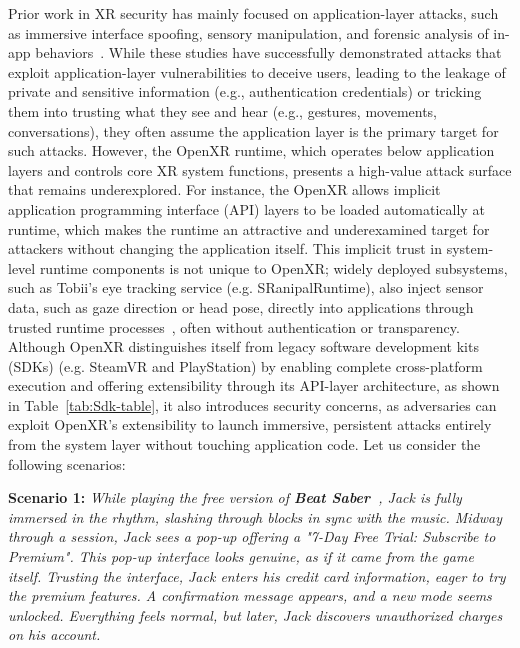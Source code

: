 \documentclass[letterpaper,twocolumn,10pt]{article}
\begin{document}
Prior work in XR security has mainly focused on application-layer attacks, such as immersive interface spoofing, sensory manipulation, and forensic analysis of in-app behaviors~\cite{yang2024inception,ReversingtheVirtualMaze,casey2019inception,kundu2025securing}. While these studies have successfully demonstrated attacks that exploit application-layer vulnerabilities to deceive users, leading to the leakage of private and sensitive information (e.g., authentication credentials) or tricking them into trusting what they see and hear (e.g., gestures, movements, conversations), they often assume the application layer is the primary target for such attacks. However, the OpenXR runtime, which operates below application layers and controls core XR system functions, presents a high-value attack surface that remains underexplored. For instance, the OpenXR allows implicit application programming interface (API) layers to be loaded automatically at runtime, which makes the runtime an attractive and underexamined target for attackers without changing the application itself. This implicit trust in system-level runtime components is not unique to OpenXR; widely deployed subsystems, such as Tobii's eye tracking service (e.g. SRanipalRuntime), also inject sensor data, such as gaze direction or head pose, directly into applications through trusted runtime processes~\cite{tobii2025runtime}, often without authentication or transparency. 
Although OpenXR distinguishes itself from legacy software development kits (SDKs) (e.g. SteamVR and PlayStation) by enabling complete cross-platform execution and offering extensibility through its API-layer architecture, as shown in Table~\ref{tab:Sdk-table}, it also introduces security concerns, as adversaries can exploit OpenXR’s extensibility to launch immersive, persistent attacks entirely from the system layer without touching application code. Let us consider the following scenarios: 

\hypertarget{scenario1}{\textbf{Scenario 1:} \textit{While playing the free version of \textbf{Beat Saber~\cite{BeatSaber}}, Jack is fully immersed in the rhythm, slashing through blocks in sync with the music. Midway through a session, Jack sees a pop-up offering a "7-Day Free Trial: Subscribe to Premium". This pop-up interface looks genuine, as if it came from the game itself. Trusting the interface, Jack enters his credit card information, eager to try the premium features. A confirmation message appears, and a new mode seems unlocked. Everything feels normal, but later, Jack discovers unauthorized charges on his account.}}
\end{document}
